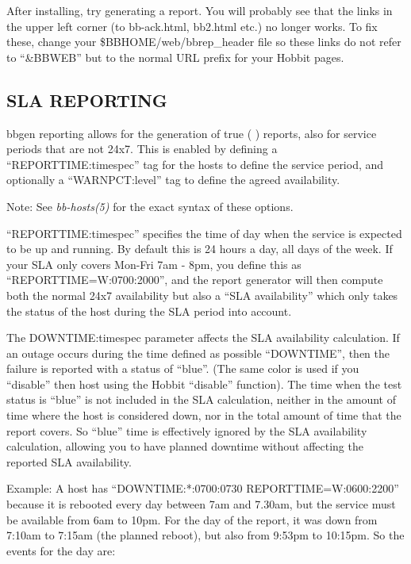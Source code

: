   After installing, try generating a report. You will probably see
  that the links in the upper left corner (to bb-ack.html, bb2.html
  etc.) no longer works. To fix these, change your
  \$BBHOME/web/bbrep\_header file so these links do not refer to
  ``\&BBWEB'' but to the normal URL prefix for your Hobbit pages. 



 
\subsection{SLA REPORTING}
 bbgen reporting allows for the generation of true  ( ) reports, also for service periods that are not 24x7. This
 is enabled by defining a ``REPORTTIME:timespec'' tag for the hosts to
 define the service period, and optionally a ``WARNPCT:level'' tag to
 define the agreed availability. 


  Note: See \emph{bb-hosts(5)}
 for the exact syntax of these options. 


  ``REPORTTIME:timespec'' specifies the time of day when the service
  is expected to be up and running. By default this is 24 hours a day,
  all days of the week. If your SLA only covers Mon-Fri 7am - 8pm, you
  define this as ``REPORTTIME=W:0700:2000'', and the report generator
  will then compute both the normal 24x7 availability but also a ``SLA
  availability'' which only takes the status of the host during the
  SLA period into account. 



  The DOWNTIME:timespec parameter affects the SLA availability
  calculation. If an outage occurs during the time defined as possible
  ``DOWNTIME'', then the failure is reported with a status of
  ``blue''. (The same color is used if you ``disable'' then host using
  the Hobbit ``disable'' function). The time when the test status is
  ``blue'' is not included in the SLA calculation, neither in the
  amount of time where the host is considered down, nor in the total
  amount of time that the report covers. So ``blue'' time is
  effectively ignored by the SLA availability calculation, allowing
  you to have planned downtime without affecting the reported SLA
  availability. 



  Example: A host has ``DOWNTIME:*:0700:0730 REPORTTIME=W:0600:2200''
  because it is rebooted every day between 7am and 7.30am, but the
  service must be available from 6am to 10pm. For the day of the
  report, it was down from 7:10am to 7:15am (the planned reboot), but
  also from 9:53pm to 10:15pm. So the events for the day are: 




